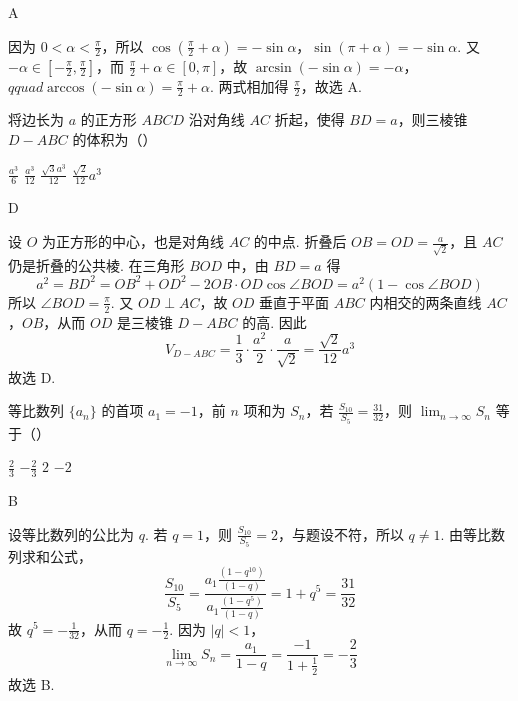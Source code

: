 \begin{answer}
A
\end{answer}

\begin{solution}
因为 \(0<\alpha<\frac{\pi}{2}\)，所以
\(\cos\left(\frac{\pi}{2}+\alpha\right)=-\sin\alpha\)，\(\sin(\pi+\alpha)=-\sin\alpha\).
又 \(-\alpha\in[-\frac{\pi}{2},\frac{\pi}{2}]\)，而 \(\frac{\pi}{2}+\alpha\in[0,\pi]\)，故
\(\arcsin(-\sin\alpha)=-\alpha\)，\(qquad \arccos(-\sin\alpha)=\frac{\pi}{2}+\alpha\).
两式相加得 \(\frac{\pi}{2}\)，故选 A.
\end{solution}

\begin{problem}
将边长为 \(a\) 的正方形 \(ABCD\) 沿对角线 \(AC\) 折起，使得 \(BD = a\)，则三棱锥 \(D - ABC\) 的体积为（\quad）

\choices
    {\(\frac{a^3}{6}\)}
    {\(\frac{a^3}{12}\)}
    {\(\frac{\sqrt{3} a^3}{12}\)}
    {\(\frac{\sqrt{2}}{12} a^3\)}
\end{problem}

\begin{answer}
D
\end{answer}

\begin{solution}
设 \(O\) 为正方形的中心，也是对角线 \(AC\) 的中点. 折叠后 \(OB=OD=\frac{a}{\sqrt2}\)，且 \(AC\) 仍是折叠的公共棱. 在三角形 \(BOD\) 中，由 \(BD=a\) 得
\[
a^2=BD^2=OB^2+OD^2-2OB\cdot OD\cos\angle BOD
=a^2\left(1-\cos\angle BOD\right)
\]
所以 \(\angle BOD=\frac{\pi}{2}\). 又 \(OD\perp AC\)，故 \(OD\) 垂直于平面 \(ABC\) 内相交的两条直线 \(AC\)，\(OB\)，从而 \(OD\) 是三棱锥 \(D-ABC\) 的高. 因此
\[
V_{D-ABC}=\frac13\cdot\frac{a^2}{2}\cdot\frac{a}{\sqrt2}
=\frac{\sqrt2}{12}a^3
\]
故选 D.
\end{solution}

\begin{problem}
等比数列 \(\{a_{n}\}\) 的首项 \(a_1 = -1\)，前 \(n\) 项和为 \(S_{n}\)，若 \(\frac{S_{10}}{S_5} = \frac{31}{32}\)，则 \(\displaystyle\lim_{n\to \infty} S_n\) 等于（\quad）

\choices
    {\(\frac{2}{3}\)}
    {\(-\frac{2}{3}\)}
    {\(2\)}
    {\(-2\)}
\end{problem}

\begin{answer}
B
\end{answer}

\begin{solution}
设等比数列的公比为 \(q\). 若 \(q=1\)，则 \(\frac{S_{10}}{S_5}=2\)，与题设不符，所以 \(q\neq1\). 由等比数列求和公式，
\[
\frac{S_{10}}{S_5}
=\frac{a_1\frac{(1-q^{10})}{(1-q)}}{a_1\frac{(1-q^5)}{(1-q)}}
=1+q^5=\frac{31}{32}
\]
故 \(q^5=-\frac1{32}\)，从而 \(q=-\frac12\). 因为 \(\lvert q\rvert<1\)，
\[
\lim_{n\to\infty}S_n=\frac{a_1}{1-q}
=\frac{-1}{1+\frac12}=-\frac23
\]
故选 B.
\end{solution}

